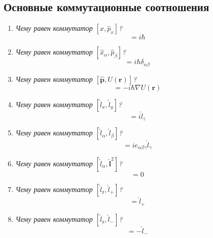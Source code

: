 \documentclass{article}
\begin{document}
\subsection*{Основные коммутационные соотношения}
\begin{enumerate}
	\item \textit{Чему равен коммутатор $[x,\hat{p}_{x}]$?}
	\begin{equation}
		[x,\hat{p}_{x}]=i\hbar
	\end{equation}
	\item \textit{Чему равен коммутатор $[\hat{x}_{\alpha},\hat{p}_{\beta}]$?}
	\begin{equation}
		[\hat{x}_{\alpha},\hat{p}_{\beta}]=i\hbar\delta_{\alpha\beta}
	\end{equation}
	\item \textit{Чему равен коммутатор $[\hat{\boldsymbol{p}},U(\boldsymbol{r})]$?}
	\begin{equation}
		[\hat{\boldsymbol{p}},U(\boldsymbol{r})]=-i\hbar\nabla U(\boldsymbol{r})
	\end{equation}
	\item \textit{Чему равен коммутатор $[\hat{l}_{x},\hat{l}_{y}]$?}
	\begin{equation}
		[\hat{l}_{x},\hat{l}_{y}]=i\hat{l}_{z}
	\end{equation}
	\item \textit{Чему равен коммутатор $[\hat{l}_{\alpha},\hat{l}_{\beta}]$?}
	\begin{equation}
		[\hat{l}_{\alpha},\hat{l}_{\beta}]=ie_{\alpha\beta\gamma}\hat{l}_{\gamma}
	\end{equation}
	\item \textit{Чему равен коммутатор $[\hat{l}_{\alpha},\hat{\boldsymbol{l}}^{2}]$?}
	\begin{equation}
		[\hat{l}_{\alpha},\hat{\boldsymbol{l}}^{2}]=0
	\end{equation}
	\item \textit{Чему равен коммутатор $[\hat{l}_{\text{z}},\hat{l}_{+}]$?}
	\begin{equation}
		[\hat{l}_{\text{z}},\hat{l}_{+}]=\hat{l}_{+}
	\end{equation}
	\item \textit{Чему равен коммутатор $[\hat{l}_{\text{z}},\hat{l}_{-}]$?}
	\begin{equation}
		[\hat{l}_{\text{z}},\hat{l}_{-}]=-\hat{l}_{-}
	\end{equation}
\end{enumerate}
\end{document}
